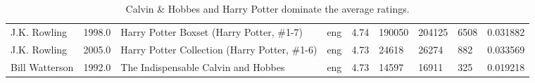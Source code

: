 \documentclass[11pt]{article}
\begin{document}
\begin{table}
\begin{tabular}{lHlHrHHHZ}
                               J.K. Rowling &                     1998.0 &           Harry Potter Boxset (Harry Potter, \#1-7) &           eng &            4.74 &         190050 &              204125 &                     6508 &       0.031882 \\
                               J.K. Rowling &                     2005.0 &       Harry Potter Collection (Harry Potter, \#1-6) &           eng &            4.73 &          24618 &               26274 &                      882 &       0.033569 \\
                             Bill Watterson &                     1992.0 &                The Indispensable Calvin and Hobbes &           eng &            4.73 &          14597 &               16911 &                      325 &       0.019218 \\
\bottomrule
\end{tabular}
    \caption[Most Highly-Rated Books]{Calvin \& Hobbes and Harry Potter dominate the average ratings.}
     \label{tbl:most-rated-books}
\end{table}


        
\end{document}
